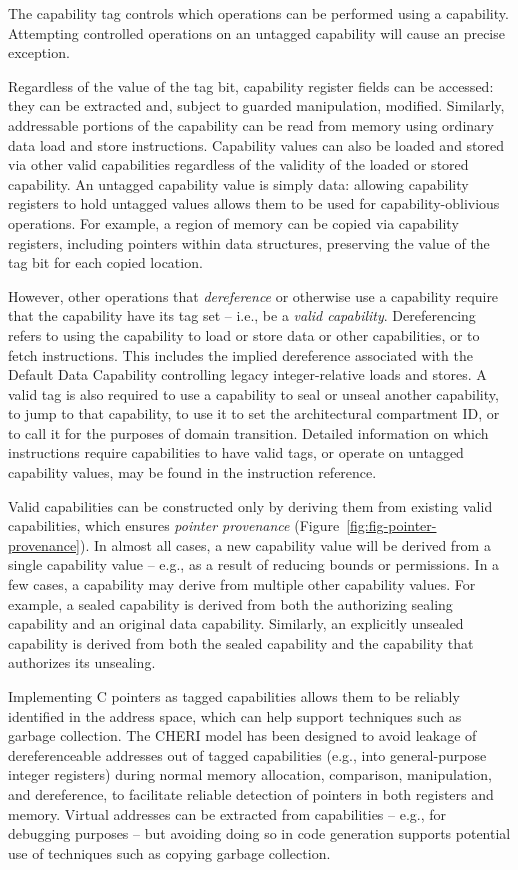 The capability tag controls which operations can be performed using a
capability.
Attempting controlled operations on an untagged capability will cause an
precise exception.

Regardless of the value of the tag bit, capability register fields can be
accessed: they can be extracted and, subject to guarded manipulation,
modified.
Similarly, addressable portions of the capability can be read from memory
using ordinary data load and store instructions.
Capability values can also be loaded and stored via other valid capabilities
regardless of the validity of the loaded or stored capability.
An untagged capability value is simply data: allowing capability registers to
hold untagged values allows them to be used for capability-oblivious
operations.
For example, a region of memory can be copied via capability registers, including pointers within data structures, preserving the value of the
tag bit for each copied location.

However, other operations that \textit{dereference} or otherwise use a
capability require that the capability have its tag set -- i.e., be a
\textit{valid capability}.
Dereferencing refers to using the capability to load or store data or other
capabilities, or to fetch instructions.
This includes the implied dereference associated with the Default Data
Capability controlling legacy integer-relative loads and stores.
A valid tag is also required to use a capability to seal or unseal another
capability, to jump to that capability, to use it to set the architectural
compartment ID, or to call it for the purposes of domain transition.
Detailed information on which instructions require capabilities to have valid
tags, or operate on untagged capability values, may be found in the
instruction reference.

Valid capabilities can be constructed only by deriving them from existing
valid capabilities, which ensures \textit{pointer provenance}
(Figure~\ref{fig:fig-pointer-provenance}).
In almost all cases, a new capability value will be derived from a single
capability value -- e.g., as a result of reducing bounds or permissions.
In a few cases, a capability may derive from multiple other capability
values.
For example, a sealed capability is derived from both the authorizing sealing
capability and an original data capability.
Similarly, an explicitly unsealed capability is derived from both the sealed
capability and the capability that authorizes its unsealing.

Implementing C pointers as tagged capabilities allows them to be reliably
identified in the address space, which can help support techniques
such as garbage collection.
The CHERI model has been designed to avoid leakage of dereferenceable addresses out of
tagged capabilities (e.g., into general-purpose integer registers) during normal
memory allocation, comparison, manipulation, and dereference, to facilitate
reliable detection of pointers in both registers and memory.
Virtual addresses can be extracted from capabilities -- e.g., for debugging
purposes -- but avoiding doing so in code generation supports potential use
of techniques such as copying garbage collection.

